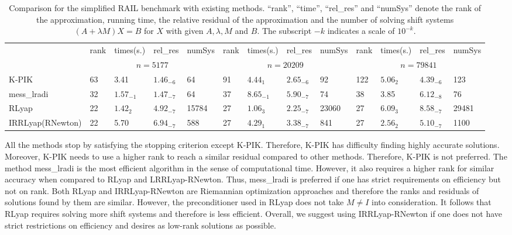\documentclass[11pt]{article}
\newcommand{\whcomm}[2]{{\sf\color{purple} #1}{\sf\color{blue} #2}}
\numberwithin{equation}{section}
\begin{document}

\begin{table}[htbp]
\caption{Comparison for the simplified RAIL benchmark with existing methods. ``rank'', ``time'', ``rel\_res'' and ``numSys'' denote the rank of the approximation, running time, the relative residual of the approximation and the number of solving shift systems $(A+\lambda M)X=B$ for $X$ with given $A,\lambda, M$ and $B$. The subscript $-k$ indicates a scale of $10^{-k}$.}
\centering
\setlength{\tabcolsep}{2.5pt}
{\scriptsize
\begin{tabular}{l|llll|llll|llll}
\hline
\multirow{2}{*}{} & rank & times(s.)   & rel\_res    & numSys & rank & times(s.)   & rel\_res    & numSys & rank & times(s.)   & rel\_res    & numSys \\ \cline{2-13} 
                  & \multicolumn{4}{c|}{$n=5177$}             & \multicolumn{4}{c|}{$n=20209$}            & \multicolumn{4}{c}{$n=79841$}             \\ \hline
K-PIK             & 63   & 3.41        & $1.46_{-6}$ & 64     & 91   & $4.44_{1}$  & $2.65_{-6}$ & 92     & 122  & $5.06_{2}$  & $4.39_{-6}$  & 123    \\
mess\_lradi       & 32   & $1.57_{-1}$ & $1.47_{-7}$ & 64     & 37   & $8.65_{-1}$ & $5.90_{-7}$ & 74     & 38   & 3.85        & $6.12_{-8}$ & 76     \\
RLyap             & 22   & $1.42_{2}$  & $4.92_{-7}$ & 15784  & 27   & $1.06_{3}$  & $2.25_{-7}$ & 23060  & 27   & $6.09_{3}$  & $8.58_{-7}$ & 29481  \\
IRRLyap(RNewton)     & 22   & 5.70        & $6.94_{-7}$ & 588    & 27   & $4.29_{1}$  & $3.38_{-7}$ & 841    & 27   & $2.56_{2}$ & $5.10_{-7}$ & 1100   \\ \hline
\end{tabular}
}
\label{NumExp-Table3}
\end{table}

All the methods stop by satisfying the stopping criterion except K-PIK. Therefore, K-PIK has difficulty finding highly accurate solutions. Moreover, K-PIK needs to use a higher rank to reach a similar residual compared to other methods. Therefore, K-PIK is not preferred. 
The method mess\_lradi is the most efficient algorithm in the sense of computational time. However, it also requires a higher rank for similar accuracy when compared to RLyap and LRRLyap-RNewton. Thus, mess\_lradi is preferred if one has strict requirements on efficiency but not on rank.
Both RLyap and IRRLyap-RNewton are Riemannian optimization approaches and therefore the ranks and residuals of solutions found by them are similar. However, the preconditioner used in RLyap does not take $M \neq I$ into consideration. It follows that RLyap requires solving more shift systems and therefore is less efficient. Overall, we suggest using IRRLyap-RNewton if one does not have strict restrictions on efficiency and desires as low-rank solutions as possible.
\end{document}
